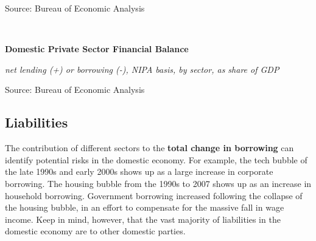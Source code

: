 \documentclass{report}
\makeatletter
\newcommand{\tbllink}[1]{\href{https://raw.githubusercontent.com/bdecon/US-chartbook/master/chartbook/data/#1}{\faTable}}
\newcommand*\short[1]{\expandafter\@gobbletwo\number\numexpr#1\relax}
\newcommand{\sbar}[4]{
		\addplot[ybar stacked, bar width=2.6pt, draw opacity=0, fill=#1] 
			table [x=#2, y=#3, col sep=comma]{#4};}
\newcommand{\dateaxisticks}{
		date coordinates in=x, axis line style={draw=none},
		xmax={2020-10-01},
		max space between ticks=40,	    
		xtick={{1990-01-01}, {1992-01-01}, {1994-01-01}, 
			{1996-01-01}, {1998-01-01}, {2000-01-01}, 
			{2002-01-01}, {2004-01-01}, {2006-01-01},
			{2008-01-01}, {2010-01-01}, {2012-01-01}, {2014-01-01},
		    {2016-01-01}, {2018-01-01}, {2020-01-01}},
		minor xtick={{1989-01-01}, {1991-01-01}, {1993-01-01},
			{1995-01-01}, {1997-01-01}, {1999-01-01}, 
			{2001-01-01}, {2003-01-01}, {2005-01-01}, {2007-01-01},
		    {2009-01-01}, {2011-01-01}, {2013-01-01}, {2015-01-01},
		    {2017-01-01}, {2019-01-01}},
		enlarge y limits={0.06}, enlarge x limits={0.01},
		}
\newcommand{\bbar}[2]{extra #1 ticks = {{#2}}, extra #1 tick labels = ,
		extra #1 tick style = {grid=major, grid style={thick, black!25}},}
\newcommand{\rbars}{
		\fill[color=black!10] (axis cs:{1990-07-01},\pgfkeysvalueof{/pgfplots/ymin}) rectangle 
			(axis cs:{1991-03-01}, \pgfkeysvalueof{/pgfplots/ymax});
		\fill[color=black!10] (axis cs:{2007-12-01},\pgfkeysvalueof{/pgfplots/ymin}) rectangle 
			(axis cs:{2009-07-01}, \pgfkeysvalueof{/pgfplots/ymax});
		\fill[color=black!10] (axis cs:{2001-03-01},\pgfkeysvalueof{/pgfplots/ymin}) rectangle 
			(axis cs:{2001-11-01}, \pgfkeysvalueof{/pgfplots/ymax});
		\fill[color=black!10] (axis cs:{2020-02-01},\pgfkeysvalueof{/pgfplots/ymin}) rectangle 
			(axis cs:{2020-10-01}, \pgfkeysvalueof{/pgfplots/ymax});}
\makeatother
\begin{document}
{{\begin{minipage}{0.76\textwidth}
\footnotesize{Source: Bureau of Economic Analysis} \hfill \tbllink{sectbal.csv} 

\vspace{5mm}

\small  \\



\vspace{2mm}

\normalsize \textbf{Domestic Private Sector Financial Balance}

\footnotesize{\textit{net lending (+) or borrowing (-), NIPA basis, by sector, as share of GDP}}

\hspace*{-3mm} 

\footnotesize{Source: Bureau of Economic Analysis} \hfill \tbllink{sectbal2.csv}

\end{minipage}

\newpage

\begin{minipage}{0.76\textwidth}

\subsection*{\color{black!70} \seriffont Liabilities}

\small The contribution of different sectors to the \textbf{total change in borrowing} can identify potential risks in the domestic economy. For example, the tech bubble of the late 1990s and early 2000s shows up as a large increase in corporate borrowing. The housing bubble from the 1990s to 2007 shows up as an increase in household borrowing. Government borrowing increased following the collapse of the housing bubble, in an effort to compensate for the massive fall in wage income. Keep in mind, however, that the vast majority of liabilities in the domestic economy are to other domestic parties.\\


\end{minipage}}}
\end{document}
